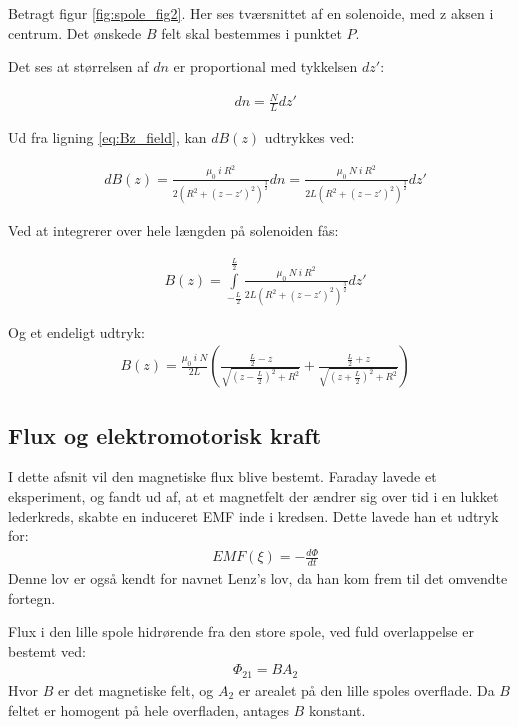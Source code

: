 Betragt figur \ref{fig:spole_fig2}. Her ses tværsnittet af en solenoide, med z aksen i centrum. Det ønskede $B$ felt skal bestemmes i punktet $P$.

Det ses at størrelsen af $dn$ er proportional med tykkelsen $dz'$:

\begin{align}
	&dn=\frac{N}{L} dz'
\end{align}



Ud fra ligning \ref{eq:Bz_field}, kan $dB(z)$ udtrykkes ved: 

\begin{align}
	&dB(z)=\frac{\mu_0 \: i \: R^2}{2(R^2+(z-z')^2)^\frac{3}{2}}dn=\frac{\mu_0 \: N \: i \: R^2}{2L(R^2+(z-z')^2)^\frac{3}{2}}dz'
\end{align}

Ved at integrerer over hele længden på solenoiden fås:

\begin{align}
	&B(z)=\int\limits_{-\frac{L}{2}}^{\frac{L}{2}}\frac{\mu_0 \: N \: i \: R^2}{2L(R^2+(z-z')^2)^\frac{3}{2}}dz'
\end{align}

Og et endeligt udtryk:
\begin{align}
	&B(z)= \frac{\mu_0 \: i \: N}{2L}\left(\frac{\frac{L}{2}-z}{\sqrt{(z-\frac{L}{2})^2+R^2}}+\frac{\frac{L}{2}+z}{\sqrt{(z+\frac{L}{2})^2+R^2}}\right) \label{eq:B_field2}
\end{align}
\subsection{Flux og elektromotorisk kraft}
I dette afsnit vil den magnetiske flux blive bestemt.  
Faraday lavede et eksperiment, og fandt ud af, at et magnetfelt der ændrer sig over tid i en lukket lederkreds, skabte en induceret EMF inde i kredsen.
Dette lavede han et udtryk for:
\begin{align}
	&EMF(\xi) = - \frac{d\Phi}{dt}
\end{align}
Denne lov er også kendt for navnet Lenz's lov, da han kom frem til det omvendte fortegn.

Flux i den lille spole hidrørende fra den store spole, ved fuld overlappelse er bestemt ved:
\begin{align}
	&\Phi_{21} = BA_2
\end{align}
Hvor $B$ er det magnetiske felt, og $A_2$ er arealet på den lille spoles overflade.
Da $B$ feltet er homogent på hele overfladen, antages $B$ konstant. 

